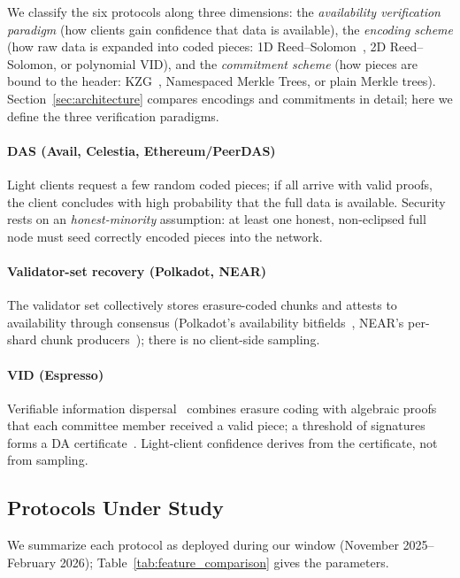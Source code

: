 We classify the six protocols along three dimensions: the \emph{availability verification paradigm} (how clients gain confidence that data is available), the \emph{encoding scheme} (how raw data is expanded into coded pieces: 1D Reed--Solomon~\cite{Reed1960RS}, 2D Reed--Solomon, or polynomial VID), and the \emph{commitment scheme} (how pieces are bound to the header: KZG~\cite{KZG_Original}, Namespaced Merkle Trees, or plain Merkle trees).
Section~\ref{sec:architecture} compares encodings and commitments in detail; here we define the three verification paradigms.

\paragraph{DAS (Avail, Celestia, Ethereum/PeerDAS)}
Light clients request a few random coded pieces; if all arrive with valid proofs, the client concludes with high probability that the full data is available.
Security rests on an \emph{honest-minority} assumption: at least one honest, non-eclipsed full node must seed correctly encoded pieces into the network.

\paragraph{Validator-set recovery (Polkadot, NEAR)}
The validator set collectively stores erasure-coded chunks and attests to availability through consensus (Polkadot's availability bitfields~\cite{Jeff_Burdges_ELVES}, NEAR's per-shard chunk producers~\cite{NEAR_Nightshade_Scaling_Blockchain}); there is no client-side sampling.

\paragraph{VID (Espresso)}
Verifiable information dispersal~\cite{Cachin2005AVID} combines erasure coding with algebraic proofs that each committee member received a valid piece; a threshold of signatures forms a DA certificate~\cite{Espresso:Hotshot_and_Triamisu}.
Light-client confidence derives from the certificate, not from sampling.

\subsection{Protocols Under Study}
\label{subsec:protocol-descriptions}

We summarize each protocol as deployed during our window (November 2025--February 2026); Table~\ref{tab:feature_comparison} gives the parameters.

